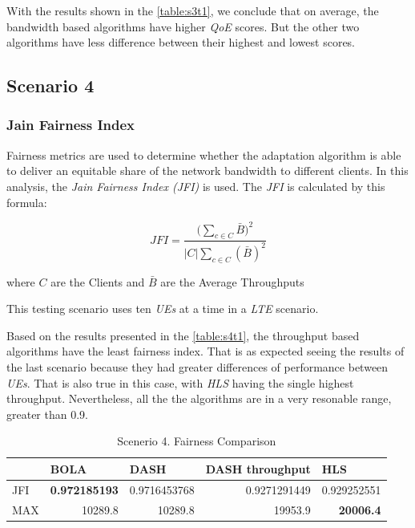 With the results shown in the \autoref{table:s3t1}, we conclude that on average,
the bandwidth based algorithms have higher \textit{QoE} scores. But the other two
algorithms have less difference between their highest and lowest scores.

\subsection{Scenario 4}

\subsubsection{Jain Fairness Index}

Fairness metrics are used to determine whether the adaptation 
algorithm is able to deliver an equitable share of the network bandwidth 
to different clients. In this analysis, the \textit{Jain Fairness Index (JFI)}
\cite{jfi} is used. The \textit{JFI} is calculated by this formula:

\begin{equation}
    JFI=\frac{\bigg(\sum\limits_{c\in C}\bar{B}\bigg)^2}{\left | C \right |\sum\limits_{c\in C}(\bar{B})^2}
\end{equation}

where  $C$ are the Clients and $\bar{B}$ are the Average Throughputs

This testing scenario uses ten \textit{UEs} at a time in a \textit{LTE} scenario.

Based on the results presented in the \autoref{table:s4t1}, the throughput based algorithms 
have the least fairness index. That is as expected seeing the results of the last scenario
because they had greater differences of performance between \textit{UEs}. That is also true in
this case, with \textit{HLS} having the single highest throughput. Nevertheless, all the
the algorithms are in a very resonable range, greater than 0.9.

\begin{table}[h]
    \centering
    \begin{tabular}{@{}lrrrr@{}}
    \toprule
        & \multicolumn{1}{l}{BOLA} & \multicolumn{1}{l}{DASH} & \multicolumn{1}{l}{DASH throughput} & \multicolumn{1}{l}{HLS} \\ \midrule
    JFI & \textbf{0.972185193}     & 0.9716453768             & 0.9271291449                        & 0.929252551             \\
    MAX & 10289.8                  & 10289.8                  & 19953.9                             & \textbf{20006.4}        \\ \bottomrule
    \end{tabular}
    \caption{Scenerio 4. Fairness Comparison}
    \label{table:s4t1}
\end{table}


